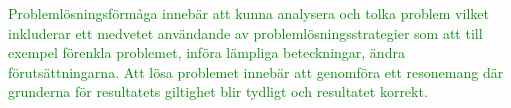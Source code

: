 

\begin{displayquote}
\textcolor{green}{Problemlösningsförmåga innebär att kunna analysera och tolka problem vilket inkluderar ett medvetet användande av problemlösningsstrategier som att till exempel förenkla problemet, införa lämpliga beteckningar, ändra förutsättningarna. Att lösa problemet innebär att genomföra ett resonemang där grunderna för resultatets giltighet blir tydligt och resultatet korrekt.}
\end{displayquote}



